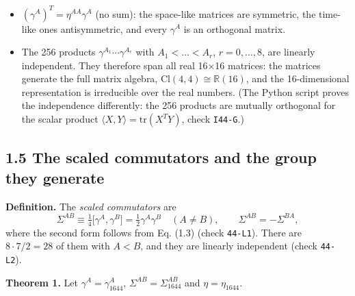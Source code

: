 \documentclass[
  10pt,
]{article}
\providecommand{\tightlist}{%
  \setlength{\itemsep}{0pt}\setlength{\parskip}{0pt}}
\begin{document}
\begin{itemize}
\tightlist
\item
  \((\gamma^A)^T=\eta^{AA}\gamma^A\) (no sum): the space-like matrices
  are symmetric, the time-like ones antisymmetric, and every
  \(\gamma^A\) is an orthogonal matrix.
\item
  The 256 products \(\gamma^{A_1}\cdots\gamma^{A_r}\) with
  \(A_1<\dots<A_r\), \(r=0,\dots,8\), are linearly independent. They
  therefore span all real 16×16 matrices: the matrices generate the full
  matrix algebra, \(\mathrm{Cl}(4,4)\cong\mathbb{R}(16)\), and the
  16-dimensional representation is irreducible over the real numbers.
  (The Python script proves the independence differently: the 256
  products are mutually orthogonal for the scalar product
  \(\langle X,Y\rangle=\mathrm{tr}(X^TY)\), check \texttt{I44-G}.)
\end{itemize}

\hypertarget{the-scaled-commutators-and-the-group-they-generate}{%
\subsection{1.5 The scaled commutators and the group they
generate}\label{the-scaled-commutators-and-the-group-they-generate}}

\textbf{Definition.} The \emph{scaled commutators} are
\[\Sigma^{AB}\equiv\tfrac14\big[\gamma^A,\gamma^B\big]=\tfrac12\gamma^A\gamma^B\quad(A\neq B),\qquad\Sigma^{AB}=-\Sigma^{BA},\tag{1.4}\]
where the second form follows from Eq. (1.3) (check \texttt{44-L1}).
There are \(8\cdot7/2=28\) of them with \(A<B\), and they are linearly
independent (check \texttt{44-L2}).

\textbf{Theorem 1.} Let \(\gamma^A=\gamma_{1644}^A\),
\(\Sigma^{AB}=\Sigma_{1644}^{AB}\) and \(\eta=\eta_{1644}\).
\end{document}
